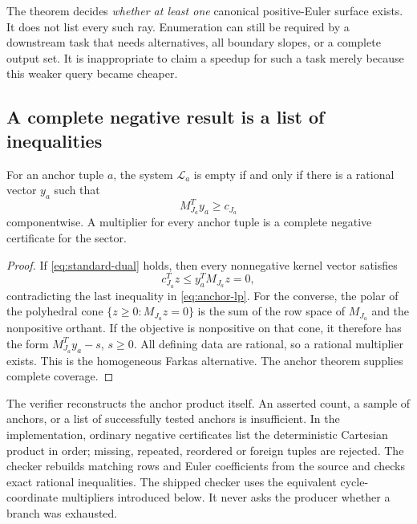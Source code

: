 The theorem decides \emph{whether at least one} canonical positive-Euler surface exists. It does not list every such ray. Enumeration can still be required by a downstream task that needs alternatives, all boundary slopes, or a complete output set. It is inappropriate to claim a speedup for such a task merely because this weaker query became cheaper.

\subsection{A complete negative result is a list of inequalities}

\begin{theorem}\label{thm:dual}
For an anchor tuple $a$, the system $\mathcal L_a$ is empty if and only if there is a rational vector $y_a$ such that
\begin{equation}\label{eq:standard-dual}
 M_{J_a}^{T}y_a\ge c_{J_a}
\end{equation}
componentwise. A multiplier for every anchor tuple is a complete negative certificate for the sector.
\end{theorem}
\begin{proof}
If \eqref{eq:standard-dual} holds, then every nonnegative kernel vector satisfies
\[
 c_{J_a}^{T}z\le y_a^{T}M_{J_a}z=0,
\]
contradicting the last inequality in \eqref{eq:anchor-lp}. For the converse, the polar of the polyhedral cone $\{z\ge0:M_{J_a}z=0\}$ is the sum of the row space of $M_{J_a}$ and the nonpositive orthant. If the objective is nonpositive on that cone, it therefore has the form $M_{J_a}^{T}y_a-s$, $s\ge0$. All defining data are rational, so a rational multiplier exists. This is the homogeneous Farkas alternative. The anchor theorem supplies complete coverage.
\end{proof}

The verifier reconstructs the anchor product itself. An asserted count, a sample of anchors, or a list of successfully tested anchors is insufficient. In the implementation, ordinary negative certificates list the deterministic Cartesian product in order; missing, repeated, reordered or foreign tuples are rejected. The checker rebuilds matching rows and Euler coefficients from the source and checks exact rational inequalities. The shipped checker uses the equivalent cycle-coordinate multipliers introduced below. It never asks the producer whether a branch was exhausted.

